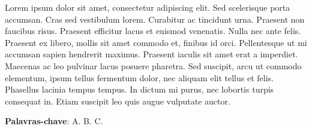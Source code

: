\begin{resumo}

Lorem ipsum dolor sit amet, consectetur adipiscing elit. Sed scelerisque porta accumsan. Cras sed vestibulum lorem. Curabitur ac tincidunt urna. Praesent non faucibus risus. Praesent efficitur lacus et euismod venenatis. Nulla nec ante felis. Praesent ex libero, mollis sit amet commodo et, finibus id orci. Pellentesque ut mi accumsan sapien hendrerit maximus. Praesent iaculis sit amet erat a imperdiet. Maecenas ac leo pulvinar lacus posuere pharetra. Sed suscipit, arcu ut commodo elementum, ipsum tellus fermentum dolor, nec aliquam elit tellus et felis. Phasellus lacinia tempus tempus. In dictum mi purus, nec lobortis turpis consequat in. Etiam suscipit leo quis augue vulputate auctor.

 \vspace{\onelineskip}
    
 \noindent
 \textbf{Palavras-chave}: A. B. C.
\end{resumo}
